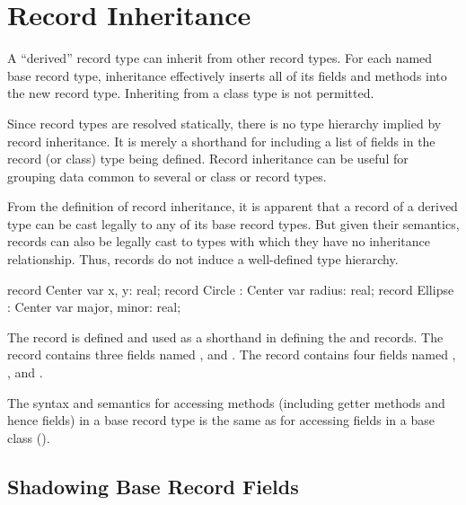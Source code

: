 \section{Record Inheritance}
\label{Record_Inheritance}

A ``derived'' record type can inherit from other record types.  For each named
base record type, inheritance effectively inserts all of its fields and methods
into the new record type.  Inheriting from a class type is not permitted.

Since record types are resolved statically, there is no type hierarchy implied
by record inheritance.  It is merely a shorthand for including a list of fields
in the record (or class) type being defined.  Record inheritance can be useful
for grouping data common to several or class or record types.

From the definition of record inheritance, it is apparent that a record of a
derived type can be cast legally to any of its base record types.  But given
their semantics, records can also be legally cast to types with which they have
no inheritance relationship.  Thus, records do not induce a well-defined type
hierarchy.

\begin{example}
\begin{chapelpre}
\end{chapelpre}
\begin{chapel}
record Center { var x, y: real; }
record Circle : Center {
  var radius: real;
}
record Ellipse : Center {
  var major, minor: real;
}
\end{chapel}
\begin{chapeloutput}
\end{chapeloutput}
The record  is defined and used as a shorthand in defining
the  and  records.  The  record contains
three  fields named ,  and .  The
 record contains four  fields named , ,
 and .
\end{example}

The syntax and semantics for accessing methods (including getter methods and
hence fields) in a base
record type is the same as for accessing fields in a base class ().

\subsection{Shadowing Base Record Fields}
\label{Shadowing_Base_Record_Fields}

